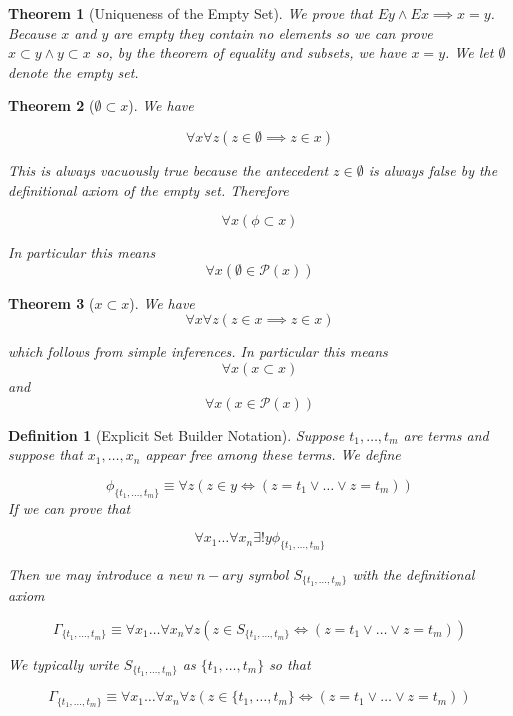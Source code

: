 \documentclass[12pt]{article}
\theoremstyle{break}
\newtheorem{definition}{Definition}[section]
\theoremstyle{break}
\newtheorem{theorem}{Theorem}[section]
\theoremstyle{break}
\theoremstyle{break}
\theoremstyle{break}
\newtheorem{informal definition}[definition]{Informal Definition}
\begin{document}
\begin{theorem}[Uniqueness of the Empty Set]
We prove that $Ey \land Ex \implies x = y$.
Because $x$ and $y$ are empty they contain no elements so we can prove $x\subset y \land y \subset x$ so, by the theorem of equality and subsets, we have $x=y$.
We let $\emptyset$ denote the empty set.
\end{theorem}

\begin{theorem}[$\emptyset \subset x$]
\label{thm:emptysetsubsetx}
We have

$$
\forall x \forall z (z\in \emptyset \implies  z \in x)
$$

This is always vacuously true because the antecedent $z\in \emptyset$ is always false by the definitional axiom of the empty set.
Therefore

$$
\forall x (\phi \subset x)
$$

In particular this means
$$
\forall x (\emptyset \in \mathcal{P}(x))
$$
\end{theorem}

\begin{theorem}[$x\subset x$]
\label{thm:xsubsetx}
We have
$$
\forall x \forall z(z \in x \implies z\in x)
$$

which follows from simple inferences.
In particular this means
$$
\forall x (x \subset x)
$$
and
$$
\forall x(x\in \mathcal{P}(x))
$$
\end{theorem}

\begin{definition}[Explicit Set Builder Notation]
Suppose $t_1, \ldots, t_m$ are terms and suppose that $x_1, \ldots, x_n$ appear free among these terms.
We define

$$
\phi_{\{t_1,\ldots, t_m\}} \equiv \forall z(z\in y \iff (z=t_1 \lor \ldots \lor z=t_m))
$$
If we can prove that

$$
\forall x_1\ldots \forall x_n \exists! y \phi_{\{t_1, \ldots, t_m\}}
$$

Then we may introduce a new $n-ary$ symbol $S_{\{t_1, \ldots, t_m\}}$ with the definitional axiom

$$
\Gamma_{\{t_1,\ldots, t_m\}} \equiv \forall x_1 \ldots \forall x_n \forall z (z\in S_{\{t_1,\ldots, t_m\}} \iff (z=t_1 \lor \ldots \lor z=t_m))
$$

We typically write $S_{\{t_1,\ldots,t_m\}}$ as $\{t_1,\ldots, t_m\}$ so that

$$
\Gamma_{\{t_1,\ldots, t_m\}} \equiv \forall x_1 \ldots \forall x_n \forall z(z\in \{t_1,\ldots, t_m\} \iff(z=t_1\lor \ldots \lor z=t_m))
$$
\end{definition}
\end{document}

